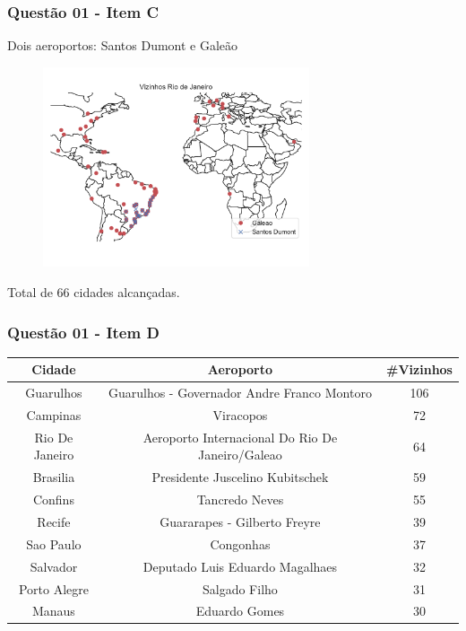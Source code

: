 \documentclass[aspectratio=169,usenames,dvipsnames]{beamer}
\begin{document}
\begin{frame}
  \frametitle{Questão 01 - Item C}
  Dois aeroportos: Santos Dumont e Galeão
  
  \begin{figure}
    \includegraphics[width=0.7\textwidth]{figs/vizinhos_rio_de_janeiro.pdf}
  \end{figure}

  Total de 66 cidades alcançadas.
\end{frame}

\begin{frame}
  \frametitle{Questão 01 - Item D}

  \begin{tabular}{|c|c|c|}
    \hline
    Cidade & Aeroporto & \#Vizinhos \\
    \hline
    Guarulhos & Guarulhos - Governador Andre Franco Montoro & 106 \\
    \hline
    Campinas & Viracopos & 72 \\
    \hline
    Rio De Janeiro & Aeroporto Internacional Do Rio De Janeiro/Galeao & 64 \\
    \hline
    Brasilia & Presidente Juscelino Kubitschek & 59 \\
    \hline
    Confins & Tancredo Neves & 55 \\
    \hline
    Recife & Guararapes - Gilberto Freyre & 39 \\
    \hline
    Sao Paulo & Congonhas & 37 \\
    \hline
    Salvador & Deputado Luis Eduardo Magalhaes & 32 \\
    \hline
    Porto Alegre & Salgado Filho & 31 \\
    \hline
    Manaus & Eduardo Gomes & 30 \\
    \hline
  \end{tabular}

\end{frame}
\end{document}
